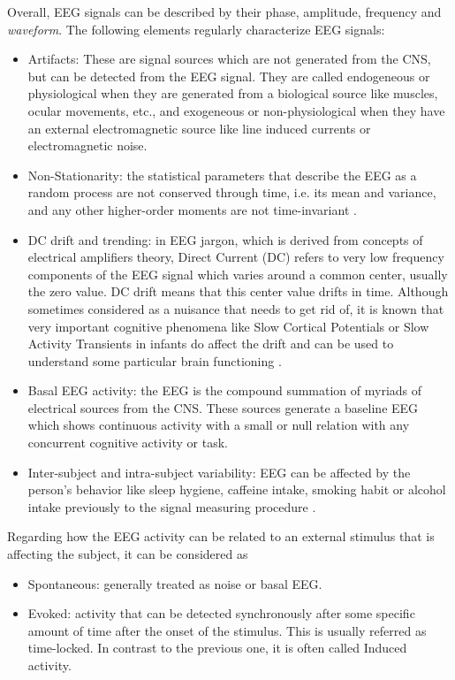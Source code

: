 \documentclass[brainsci,article,submit,moreauthors,pdftex,10pt,a4paper]{mdpi}
\begin{document}
Overall, EEG signals can be described by their phase, amplitude,  frequency and \textit{waveform}.  The following elements regularly  characterize EEG signals:

\begin{itemize}
\item Artifacts:  These are signal sources which are not generated from the CNS, but can be detected from the EEG signal.  They are called endogeneous or physiological when they are generated from a biological source like muscles, ocular movements, etc., and exogeneous or non-physiological when they have an external electromagnetic source like line induced currents or electromagnetic noise\citep{Weeda2012}.
\item Non-Stationarity: the statistical parameters that describe the EEG as a random process are not conserved through time, i.e. its mean and variance, and any other higher-order moments are not time-invariant \citep{Jansen1991}.
\item DC drift and trending: in EEG jargon, which is derived from concepts of electrical amplifiers theory, Direct Current (DC) refers to very low frequency components of the EEG signal which varies around a common center, usually the zero value.  DC drift means that this center value drifts in time.  Although sometimes considered as a nuisance that needs to get rid of, it is known that very important cognitive phenomena like Slow Cortical Potentials or Slow Activity Transients in infants do affect the drift and can be used to understand some particular brain functioning \cite{Schomer2010}.
\item Basal EEG activity: the EEG is the compound summation of myriads of electrical sources from the CNS.  These sources generate a baseline EEG which shows continuous activity with a small or null relation with any concurrent cognitive activity or task.
\item Inter-subject and intra-subject variability: EEG can be affected by the person's behavior like sleep hygiene, caffeine intake, smoking habit or alcohol intake previously to the signal measuring procedure \citep{Farzan2017}.
\end{itemize}

Regarding how the EEG activity can be related to an external stimulus that is affecting the subject, it can be considered as

\begin{itemize}
\item Spontaneous: generally treated as noise or basal EEG.
\item Evoked: activity that can be detected synchronously after some specific amount of time after the onset of the stimulus.  This is usually referred as time-locked.  In contrast to the previous one, it is often called Induced activity.
\end{itemize}
\end{document}
